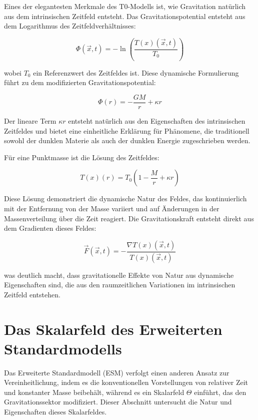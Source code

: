 \documentclass[12pt,a4paper]{article}
\newcommand{\Tfield}{T(x)}
\newcommand{\Tzero}{T_0}
\newcommand{\vecx}{\vec{x}}
\begin{document}
	Eines der elegantesten Merkmale des T0-Modells ist, wie Gravitation natürlich aus dem intrinsischen Zeitfeld entsteht. Das Gravitationspotential entsteht aus dem Logarithmus des Zeitfeldverhältnisses:
	
	\begin{equation}
		\Phi(\vecx,t) = -\ln\left(\frac{\Tfield(\vecx,t)}{\Tzero}\right)
	\end{equation}
	
	wobei \(\Tzero\) ein Referenzwert des Zeitfeldes ist. Diese dynamische Formulierung führt zu dem modifizierten Gravitationspotential:
	
	\begin{equation}
		\Phi(r) = -\frac{GM}{r} + \kappa r
	\end{equation}
	
	Der lineare Term \(\kappa r\) entsteht natürlich aus den Eigenschaften des intrinsischen Zeitfeldes und bietet eine einheitliche Erklärung für Phänomene, die traditionell sowohl der dunklen Materie als auch der dunklen Energie zugeschrieben werden.
	
	Für eine Punktmasse ist die Lösung des Zeitfeldes:
	
	\begin{equation}
		\Tfield(r) = \Tzero\left(1 - \frac{M}{r} + \kappa r\right)
	\end{equation}
	
	Diese Lösung demonstriert die dynamische Natur des Feldes, das kontinuierlich mit der Entfernung von der Masse variiert und auf Änderungen in der Massenverteilung über die Zeit reagiert. Die Gravitationskraft entsteht direkt aus dem Gradienten dieses Feldes:
	
	\begin{equation}
		\vec{F}(\vecx,t) = -\frac{\nabla\Tfield(\vecx,t)}{\Tfield(\vecx,t)}
	\end{equation}
	
	was deutlich macht, dass gravitationelle Effekte von Natur aus dynamische Eigenschaften sind, die aus den raumzeitlichen Variationen im intrinsischen Zeitfeld entstehen.
	
	\section{Das Skalarfeld des Erweiterten Standardmodells}
	\label{sec:esm_scalar_field}
	
	Das Erweiterte Standardmodell (ESM) verfolgt einen anderen Ansatz zur Vereinheitlichung, indem es die konventionellen Vorstellungen von relativer Zeit und konstanter Masse beibehält, während es ein Skalarfeld \(\Theta\) einführt, das den Gravitationssektor modifiziert. Dieser Abschnitt untersucht die Natur und Eigenschaften dieses Skalarfeldes.
	
\end{document}

